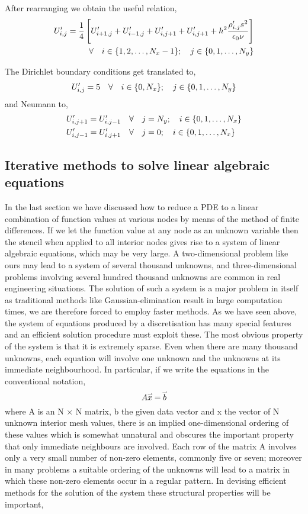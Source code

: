 After rearranging we obtain the useful relation,
\begin{align} \label{eq:difference equation}
    U'_{i,j} = \frac{1}{4} \left[ U'_{i+1,j}+ U'_{i-1,j} + U'_{i,j+1}+ U'_{i,j+1} + h^2\frac{\rho'_{i,j} s^2}{\epsilon_0 \nu} \right] \\ \hspace{0.35cm} \forall \hspace{0.35cm} i \in \{1,2,\dots,N_x-1\} ; \hspace{0.35cm} j \in \{0,1,\dots,N_y\} 
\end{align}

The Dirichlet boundary conditions get translated to,
\begin{align*}
    U'_{i,j} = 5 \hspace{0.35cm} \forall \hspace{0.35cm} i \in \{0,N_x\} ; \hspace{0.35cm} j \in \{0,1,\dots,N_y\}
\end{align*}
and Neumann to,
\begin{align*}
    &U'_{i,j+1} = U'_{i,j-1} \hspace{0.35cm} \forall \hspace{0.35cm} j = N_y ; \hspace{0.35cm} i \in \{0,1,\dots,N_x\} \\
    &U'_{i,j-1} = U'_{i,j+1} \hspace{0.35cm} \forall \hspace{0.35cm} j = 0 ; \hspace{0.35cm} i \in \{0,1,\dots,N_x\} 
\end{align*}
\subsection{Iterative methods to solve linear algebraic equations}

In the last section we have discussed how to reduce a PDE to a linear combination of function values at various nodes by means of the method of finite differences. If we let the function value at any node as an unknown variable then the stencil when applied to all interior nodes gives rise to a system of linear algebraic equations, which may be very large. A two-dimensional problem like ours may lead to a system of several thousand unknowns, and three-dimensional problems involving several hundred thousand unknowns are common in real engineering situations. The solution of such a system is a major problem in itself as traditional methods like Gaussian-elimination result in large computation times, we are therefore forced to employ faster methods. As we have seen above, the system of equations produced by a discretisation has many special features and an eﬃcient solution procedure must exploit these. The most obvious property of the system is that it is extremely sparse. Even when there are many thousand unknowns, each equation will involve one unknown and the unknowns at its immediate neighbourhood. In particular, if we write the equations in the conventional notation,
\begin{equation*}
    A \accentset{\rightharpoonup}{x} = \accentset{\rightharpoonup}{b} 
\end{equation*}
where A is an N × N matrix, b the given data vector and x the vector of N unknown interior mesh values, there is an implied one-dimensional ordering of these values which is somewhat unnatural and obscures the important property that only immediate neighbours are involved. Each row of the matrix A involves only a very small number of non-zero elements, commonly ﬁve or seven; moreover in many problems a suitable ordering of the unknowns will lead to a matrix in which these non-zero elements occur in a regular pattern. In devising eﬃcient methods for the solution of the system these structural properties will be important,

